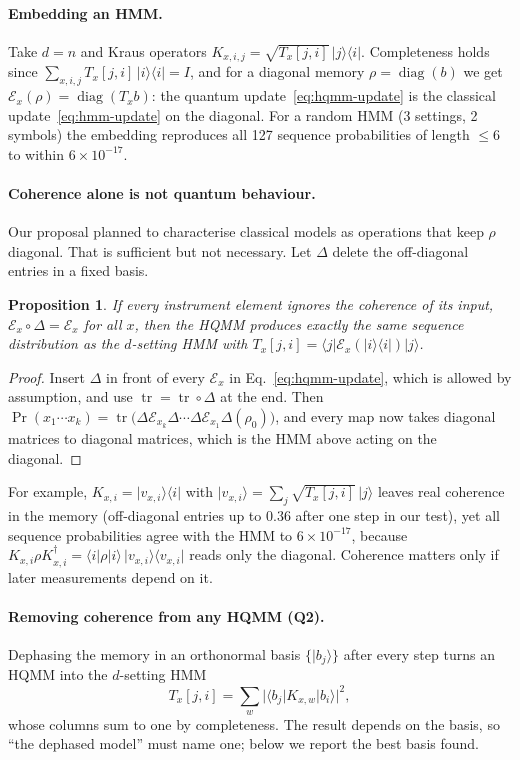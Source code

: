 \documentclass[11pt]{article}
\newcommand{\ket}[1]{\lvert #1\rangle}
\newcommand{\bra}[1]{\langle #1\rvert}
\newcommand{\tr}{\operatorname{tr}}
\newcommand{\E}{\mathcal{E}}
\newcommand{\Deph}{\Delta}
\newtheorem{proposition}{Proposition}
\begin{document}
\paragraph{Embedding an HMM.} Take $d=n$ and Kraus operators $K_{x,i,j} = \sqrt{T_x[j,i]}\,\ket{j}\bra{i}$. Completeness holds since $\sum_{x,i,j} T_x[j,i]\,\ket{i}\bra{i} = I$, and for a diagonal memory $\rho = \operatorname{diag}(b)$ we get $\E_x(\rho) = \operatorname{diag}(T_x b)$: the quantum update~\eqref{eq:hqmm-update} is the classical update~\eqref{eq:hmm-update} on the diagonal. For a random HMM (3 settings, 2 symbols) the embedding reproduces all 127 sequence probabilities of length $\le 6$ to within $6\times10^{-17}$.

\paragraph{Coherence alone is not quantum behaviour.} Our proposal planned to characterise classical models as operations that keep $\rho$ diagonal. That is sufficient but not necessary. Let $\Deph$ delete the off-diagonal entries in a fixed basis.

\begin{proposition}\label{prop:coherence}
If every instrument element ignores the coherence of its input, $\E_x\circ\Deph = \E_x$ for all $x$, then the HQMM produces exactly the same sequence distribution as the $d$-setting HMM with $T_x[j,i] = \bra{j}\E_x(\ket{i}\bra{i})\ket{j}$.
\end{proposition}
\begin{proof}
Insert $\Deph$ in front of every $\E_x$ in Eq.~\eqref{eq:hqmm-update}, which is allowed by assumption, and use $\tr = \tr\circ\Deph$ at the end. Then $\Pr(x_1\cdots x_k) = \tr\big(\Deph\E_{x_k}\Deph\cdots\Deph\E_{x_1}\Deph(\rho_0)\big)$, and every map now takes diagonal matrices to diagonal matrices, which is the HMM above acting on the diagonal.
\end{proof}

\noindent For example, $K_{x,i} = \ket{v_{x,i}}\bra{i}$ with $\ket{v_{x,i}} = \sum_j \sqrt{T_x[j,i]}\,\ket{j}$ leaves real coherence in the memory (off-diagonal entries up to $0.36$ after one step in our test), yet all sequence probabilities agree with the HMM to $6\times10^{-17}$, because $K_{x,i}\rho K_{x,i}^\dagger = \bra{i}\rho\ket{i}\,\ket{v_{x,i}}\bra{v_{x,i}}$ reads only the diagonal. Coherence matters only if later measurements depend on it.

\paragraph{Removing coherence from any HQMM (Q2).} Dephasing the memory in an orthonormal basis $\{\ket{b_j}\}$ after every step turns an HQMM into the $d$-setting HMM
\begin{equation}\label{eq:dephase}
  T_x[j,i] = \textstyle\sum_w \big|\bra{b_j}K_{x,w}\ket{b_i}\big|^2 ,
\end{equation}
whose columns sum to one by completeness. The result depends on the basis, so ``the dephased model'' must name one; below we report the best basis found.
\end{document}
